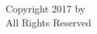 \thispagestyle{empty}

\begin{center}
	\vspace*{\fill}
	Copyright 2017 by \AuthorName\\
	All Rights Reserved	
	\vspace*{\fill}
\end{center}

